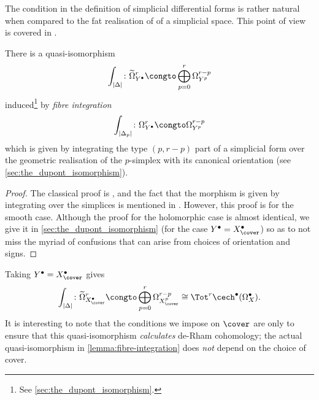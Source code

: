         The condition in the definition of simplicial differential forms is rather natural when compared to the fat realisation of of a simplicial space.
        This point of view is covered in \cite{Dupont:1976up}.

        \begin{lemma}\label{lemma:fibre-integration}
            There is a quasi-isomorphism
            \[
                \int_{|\Delta|}\colon \widetilde\Omega^r_{Y^\bullet} \congto \bigoplus_{p=0}^r\Omega^{r-p}_{Y^p}
            \]
            induced\footnote{See \cref{sec:the_dupont_isomorphism}.} by \emph{fibre integration}
            \[
                \int_{|\Delta_p|}\colon \Omega^r_{Y^\bullet} \congto \Omega^{r-p}_{Y^p}
            \]
            which is given by integrating the type $(p,r-p)$ part of a simplicial form over the geometric realisation of the $p$-simplex with its canonical orientation (see \cref{sec:the_dupont_isomorphism}).
        \end{lemma}

        \begin{proof}
            The classical proof is \cite[Theorem~2.3]{Dupont:1976up}, and the fact that the morphism is given by integrating over the simplices is mentioned in \cite[§2,~Remark~1]{Dupont:1976up}.
            However, this proof is for the smooth case.
            Although the proof for the holomorphic case is almost identical, we give it in \cref{sec:the_dupont_isomorphism} (for the case $Y^\bullet=X^\bullet_\cover$) so as to not miss the myriad of confusions that can arise from choices of orientation and signs.
        \end{proof}

        \begin{example}\label{example:fibre-integration-simplicial-forms-nerve}
            Taking $Y^\bullet=X^\bullet_\cover$ gives
            \[
                \int_{|\Delta|}\colon \widetilde\Omega^r_{X^\bullet_\cover} \congto \bigoplus_{p=0}^r\Omega^{r-p}_{X^p_\cover} \cong \Tot^r\cech^\bullet(\Omega^\bullet_X).
            \]
            It is interesting to note that the conditions we impose on $\cover$ are only to ensure that this quasi-isomorphism \emph{calculates} de-Rham cohomology; the actual quasi-isomorphism in \cref{lemma:fibre-integration} does \emph{not} depend on the choice of cover.
        \end{example}
    


